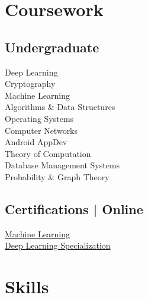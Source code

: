 \documentclass[]{deedy-resume-openfont}
\begin{document}
\begin{minipage}[t]{0.31\textwidth}
\section{Coursework}
\subsection{Undergraduate}
Deep Learning \\
Cryptography \\
Machine Learning \\
Algorithms \& Data Structures\\
Operating Systems \\
Computer Networks \\
Android AppDev \\
Theory of Computation \\    
Database Management Systems \\
Probability \& Graph Theory \\
\vspace{2mm}

\subsection{Certifications | Online}
\href{https://www.coursera.org/account/accomplishments/verify/P2RCYNY5PGAA}{Machine Learning} \\
\href{https://www.coursera.org/account/accomplishments/specialization/certificate/P76AWJ3W5CM4}{Deep Learning Specialization} \\


\section{Skills}
 {
      \\
}
\vspace{1mm}
 {
              \\
}

\vspace{1mm}
\vspace{1mm}


\end{minipage}
\end{document}
